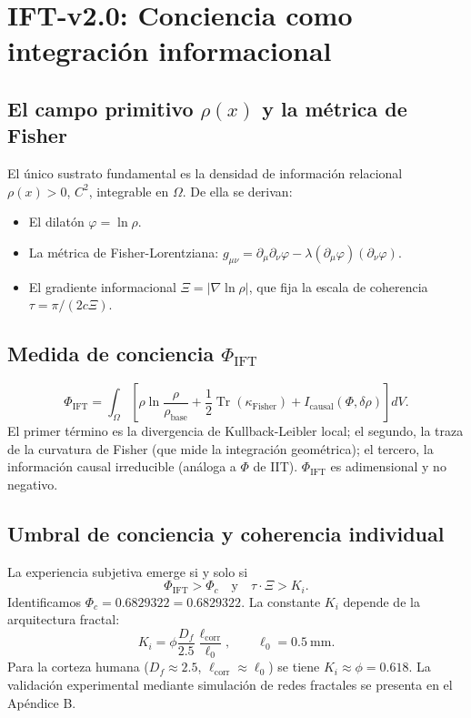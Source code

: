 \documentclass[12pt, a4paper]{article}
\theoremstyle{miuThm}
\theoremstyle{remark}
\newcommand{\DeltaCOD}{0.6829322}
\begin{document}
\section{IFT-v2.0: Conciencia como integración informacional}
\label{sec:IFT}

\subsection{El campo primitivo $\rho(x)$ y la métrica de Fisher}
El único sustrato fundamental es la densidad de información relacional $\rho(x) > 0$, $C^2$, integrable en $\Omega$. De ella se derivan:
\begin{itemize}
\item El dilatón $\varphi = \ln\rho$.
\item La métrica de Fisher-Lorentziana: $g_{\mu\nu} = \partial_\mu\partial_\nu\varphi - \lambda (\partial_\mu\varphi)(\partial_\nu\varphi)$.
\item El gradiente informacional $\Xi = |\nabla\ln\rho|$, que fija la escala de coherencia $\tau = \pi/(2c\Xi)$.
\end{itemize}

\subsection{Medida de conciencia $\Phi_{\text{IFT}}$}
\begin{equation}
\Phi_{\text{IFT}} = \int_{\Omega} \left[ \rho\ln\frac{\rho}{\rho_{\text{base}}} + \frac12 \operatorname{Tr}(\kappa_{\text{Fisher}}) + I_{\text{causal}}(\Phi,\delta\rho) \right] dV.
\end{equation}
El primer término es la divergencia de Kullback-Leibler local; el segundo, la traza de la curvatura de Fisher (que mide la integración geométrica); el tercero, la información causal irreducible (análoga a $\Phi$ de IIT). $\Phi_{\text{IFT}}$ es adimensional y no negativo.

\subsection{Umbral de conciencia y coherencia individual}
La experiencia subjetiva emerge si y solo si
\begin{equation}
\Phi_{\text{IFT}} > \Phi_c \quad \text{y} \quad \tau\cdot\Xi > K_i.
\end{equation}
Identificamos $\Phi_c = \DeltaCOD = 0.6829322$. La constante $K_i$ depende de la arquitectura fractal:
\begin{equation}
\boxed{ K_i = \phi \frac{D_f}{2.5} \frac{\ell_{\text{corr}}}{\ell_0}, \qquad \ell_0 = 0.5\ \text{mm} }.
\end{equation}
Para la corteza humana ($D_f \approx 2.5$, $\ell_{\text{corr}} \approx \ell_0$) se tiene $K_i \approx \phi = 0.618$. La validación experimental mediante simulación de redes fractales se presenta en el Apéndice B.
\end{document}

